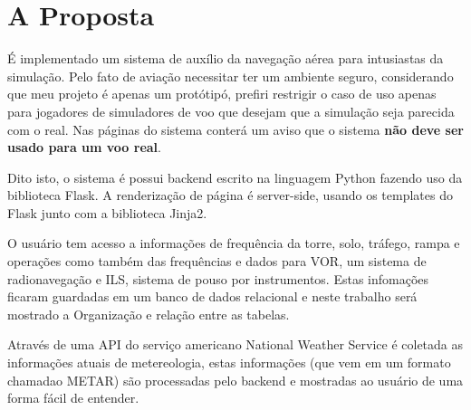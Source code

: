 \chapter{A Proposta}
É implementado um sistema de auxílio da navegação aérea para intusiastas da
simulação. Pelo fato de aviação necessitar ter um ambiente seguro, considerando
que meu projeto é apenas um protótipó, prefiri restrigir o caso de uso apenas
para jogadores de simuladores de voo que desejam que a simulação seja parecida
com o real. Nas páginas do sistema conterá um aviso que o sistema \textbf{não
deve ser usado para um voo real}.

Dito isto, o sistema é possui backend escrito na linguagem Python fazendo uso
da biblioteca Flask. A renderização de página é server-side, usando os templates
do Flask junto com a biblioteca Jinja2.

O usuário tem acesso a informações de frequência da torre, solo, tráfego, rampa
e operações como também das frequências e dados para VOR, um sistema de radionavegação
e ILS, sistema de pouso por instrumentos. Estas infomações ficaram guardadas
em um banco de dados relacional e neste trabalho será mostrado a Organização
e relação entre as tabelas.

Através de uma API do serviço americano National Weather Service é coletada 
as informações atuais de metereologia, estas informações (que vem em um formato
chamadao METAR) são processadas pelo backend e mostradas ao usuário de uma forma 
fácil de entender.


